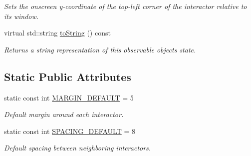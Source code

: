 \begin{DoxyCompactItemize}
\begin{DoxyCompactList}\small\item\em Sets the onscreen y-\/coordinate of the top-\/left corner of the interactor relative to its window. \end{DoxyCompactList}\item 
virtual std\+::string \mbox{\hyperlink{classsgl_1_1GObservable_a1fe5121d6528fdea3f243321b3fa3a49}{to\+String}} () const
\begin{DoxyCompactList}\small\item\em Returns a string representation of this observable object\textquotesingle{}s state. \end{DoxyCompactList}\end{DoxyCompactItemize}
\subsection*{Static Public Attributes}
\begin{DoxyCompactItemize}
\item 
static const int \mbox{\hyperlink{classsgl_1_1GContainer_a9fbdb565727493808a950b2bdfa72145}{M\+A\+R\+G\+I\+N\+\_\+\+D\+E\+F\+A\+U\+LT}} = 5
\begin{DoxyCompactList}\small\item\em Default margin around each interactor. \end{DoxyCompactList}\item 
static const int \mbox{\hyperlink{classsgl_1_1GContainer_a2f9f03af35bbe9cd402d12efb4caa4a3}{S\+P\+A\+C\+I\+N\+G\+\_\+\+D\+E\+F\+A\+U\+LT}} = 8
\begin{DoxyCompactList}\small\item\em Default spacing between neighboring interactors. \end{DoxyCompactList}\end{DoxyCompactItemize}
